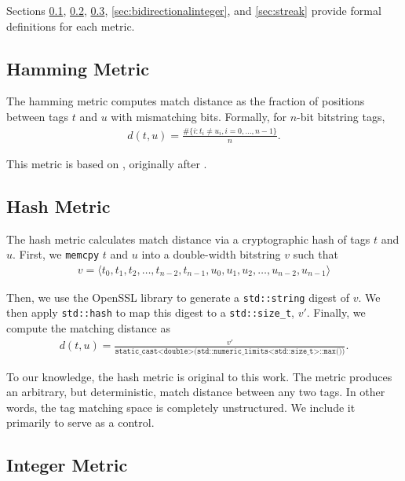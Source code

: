 Sections \ref{sec:hamming}, \ref{sec:hash}, \ref{sec:integer}, \ref{sec:bidirectionalinteger}, and \ref{sec:streak} provide formal definitions for each metric.

\subsection{Hamming Metric} \label{sec:hamming}

The hamming metric computes match distance as the fraction of positions between tags $t$ and $u$ with mismatching bits.
Formally, for $n$-bit bitstring tags,
\begin{align*}
d(t, u)
= \frac{
  \#\{ i : t_i \neq u_i, i=0, \dots ,n-1\}
}{
  n
}.
\end{align*}

This metric is based on \cite{lalejini2019else}, originally after \cite{hamming1950error}.

\subsection{Hash Metric} \label{sec:hash}

The hash metric calculates match distance via a cryptographic hash of tags $t$ and $u$.
First, we \texttt{memcpy} $t$ and $u$ into a double-width bitstring $v$ such that
\begin{align*}
v = \langle t_0, t_1, t_2, \dots, t_{n-2}, t_{n-1}, u_0, u_1, u_2, \dots, u_{n-2}, u_{n-1} \rangle
\end{align*}

Then, we use the OpenSSL library to generate a \texttt{std::string} digest of $v$.
We then apply \texttt{std::hash} to map this digest to a \texttt{std::size\_t}, $v'$.
Finally, we compute the matching distance as
\begin{align*}
d(t, u) = \frac{v'}{\texttt{static\_cast<double>(std::numeric\_limits<std::size\_t>::max())}}.
\end{align*}

To our knowledge, the hash metric is original to this work.
The metric produces an arbitrary, but deterministic, match distance between any two tags.
In other words, the tag matching space is completely unstructured.
We include it primarily to serve as a control.

\subsection{Integer Metric} \label{sec:integer}

